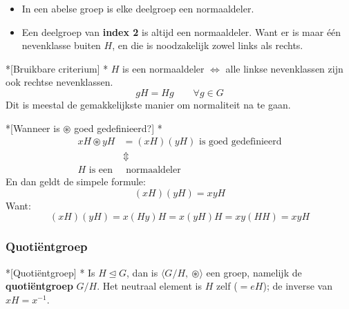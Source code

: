 \textbf{}
\begin{itemize}
    \item In een abelse groep is elke deelgroep een normaaldeler.
    \item Een deelgroep van \textbf{index 2} is altijd een normaaldeler. Want er is maar één nevenklasse buiten $H$, en die is noodzakelijk zowel links als rechts.
\end{itemize}

\begin{nicetheorem}*[Bruikbare criterium]
    \nextpart[]*
    $H$ is een normaaldeler $\iff$ alle linkse nevenklassen zijn ook rechtse nevenklassen.
    \begin{equation*}
        gH = Hg \qquad \forall g \in G
    \end{equation*}
    Dit is meestal de gemakkelijkste manier om normaliteit na te gaan.
\end{nicetheorem}

\begin{nicetheorem}*[Wanneer is $\circledast$ goed gedefinieerd?]
    \nextpart[]*
    \begin{equation*}
        \begin{aligned}
            xH \circledast yH &= (xH)(yH) \text{ is goed gedefinieerd} \\
            &\Updownarrow \\
            H \text{ is een}&\text{ normaaldeler}
        \end{aligned}
    \end{equation*}
    En dan geldt de simpele formule:
    \begin{equation*}
        (xH)(yH) = xyH
    \end{equation*}
    Want:
    \begin{equation*}
        (xH)(yH) = x(Hy)H = x(yH)H = xy(HH) = xyH
    \end{equation*}
\end{nicetheorem}

\subsubsection{Quotiëntgroep}

\begin{nicedefinition}*[Quotiëntgroep]
    \nextpart[]*
    Is $H \trianglelefteq G$, dan is $\langle G/H,\ \circledast \rangle$ een groep, namelijk de \textcolor{PineGreen!75!black}{\textbf{quotiëntgroep}} $G/H$. Het neutraal element is $H$ zelf ($=eH$); de inverse van $xH = x^{-1}$.
\end{nicedefinition}

